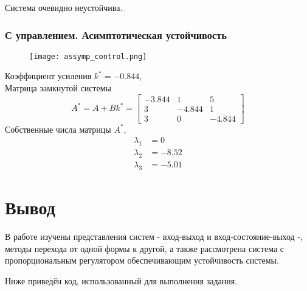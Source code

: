     Система очевидно неустойчива.

    \subsubsection*{С управлением. Асимптотическая устойчивость}
    \begin{figure}[H]
        \centering
        \texttt{[image: assymp\_control.png]}
    \end{figure}
    Коэффициент усиления $k^* = -0.844$,\\
    Матрица замкнутой системы
    \begin{equation*}
        A^* = A + Bk^* =
        \begin{bmatrix}
            -3.844& 1& 5\\
            3& -4.844& 1\\
            3& 0& -4.844
        \end{bmatrix}
    \end{equation*}
    Собственные числа матрицы $A^*$,
    \begin{equation*}
        \begin{aligned}
            \lambda_1 &= 0 \\
            \lambda_2 &= -8.52\\
            \lambda_3 &= -5.01
        \end{aligned}
    \end{equation*}

    \section*{Вывод}
    В работе изучены представления систем - вход-выход и вход-состояние-выход -, методы перехода от одной формы к другой,
    а также рассмотрена система с пропорциональным регулятором обеспечивающим устойчивость системы.

    Ниже приведён код, использованный для выполнения задания.
    \inputminted[linenos, frame=single, breakanywhere]{octave}{../src/L1T3.m}


